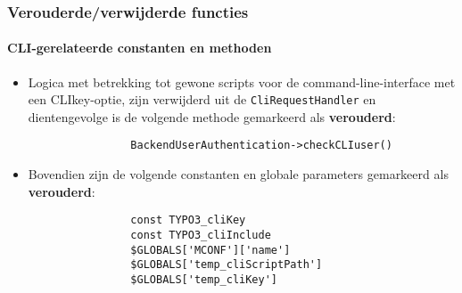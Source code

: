 
\begin{frame}[fragile]
	\frametitle{Verouderde/verwijderde functies}
	\framesubtitle{CLI-gerelateerde constanten en methoden}


	\begin{itemize}

		\item Logica met betrekking tot gewone scripts voor de command-line-interface met een CLIkey-optie, 
			zijn verwijderd uit de \texttt{CliRequestHandler} en dientengevolge is de volgende methode 
			gemarkeerd als \textbf{verouderd}:

			\begin{lstlisting}
				BackendUserAuthentication->checkCLIuser()
			\end{lstlisting}

		\item Bovendien zijn de volgende constanten en globale parameters gemarkeerd als
			 \textbf{verouderd}:

			\begin{lstlisting}
				const TYPO3_cliKey
				const TYPO3_cliInclude
				$GLOBALS['MCONF']['name']
				$GLOBALS['temp_cliScriptPath']
				$GLOBALS['temp_cliKey']
			\end{lstlisting}

	\end{itemize}

\end{frame}


